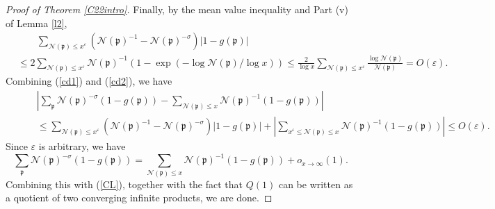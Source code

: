 \documentclass[11pt]{amsart}
\theoremstyle{definition}
\newcommand{\NN}{{\mathcal N}}
\newcommand{\mf}{\mathfrak}
\newcommand{\WS}[1]{{\color{blue}{{#1}}}}
\begin{document}
\begin{proof}[Proof of Theorem \ref{C22intro}]
   Finally, by  the mean value inequality and Part (v) of Lemma \ref{l2},
    \begin{equation}\label{cd2}
   \begin{split}
   &\qquad\sum_{\NN(\mf p)\leq x^{\varepsilon}}(\NN(\mf p)^{-1}-\NN(\mf p)^{-\sigma})\vert 1-g(\mf p)\vert
   \\&\leq 2\sum_{\NN(\mf p)\leq x^{\varepsilon}}\NN(\mf p)^{-1}(1-\exp(-\log \NN(\mf p)/\log x))
  \leq \frac{2}{\log x}\sum_{\NN(\mf p)\leq x^{\varepsilon}}\frac{\log\NN(\mf p)}{\NN(\mf p)} %
  =O(\varepsilon).
   \end{split}
   \end{equation}
Combining (\ref{cd1}) and (\ref{cd2}), we have
\begin{equation*}
    \begin{split}
        \qquad & \left| \sum_{\mf p}\NN(\mf p)^{-\sigma}(1-g(\mf p))-\sum_{\NN(\mf p)  \leq  x}\NN(\mf p)^{-1}(1-g(\mf p)) \right| 
        \\&\leq \sum_{\NN(\mf p)\leq x^{\varepsilon}}(\NN(\mf p)^{-1}-\NN(\mf p)^{-\sigma})\vert 1-g(\mf p)\vert
          +\left| \sum_{x^{\varepsilon}\leq \NN(\mf p) \leq x} \NN(\mf p)^{-1}(1-g(\mf p)) \right| 
        \leq O(\varepsilon).
    \end{split}
\end{equation*}
   Since $\varepsilon$ is arbitrary, we have 
   $$\sum_{\mf p}\NN(\mf p)^{-\sigma}(1-g(\mf p))=\sum_{\NN(\mf p)\leq x}\NN(\mf p)^{-1}(1-g(\mf p))+o_{x\to\infty}(1).$$
   Combining this with (\ref{CL}), together with the fact that $Q(1)$ can be written as a quotient of two converging infinite products, we are done.
\end{proof}
 
\end{document}
